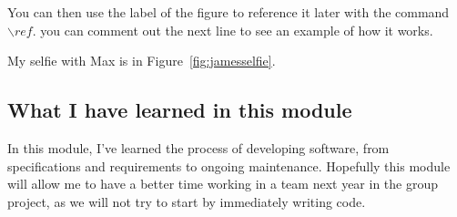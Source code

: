 You can then use the label of the figure to reference it later with the command ${\backslash}ref$. you can comment out the next line to see an example of how it works.

My selfie with Max is in  Figure~\ref{fig:jamesselfie}.

\subsection{What I have learned in this module}
In this module, I've learned the process of developing software, from specifications and requirements to ongoing maintenance. Hopefully this module will allow me to have a better time working in a team next year in the group project, as we will not try to start by immediately writing code.